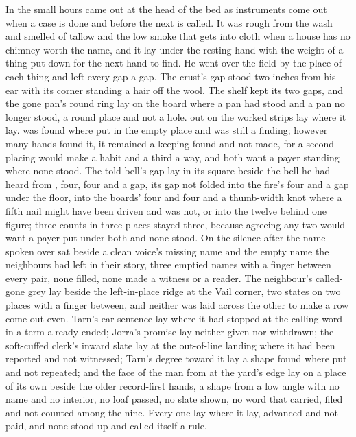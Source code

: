 In the small hours  came out at the head of the bed as instruments come out when a case is done and before the next is called. It was rough from the wash and smelled of tallow and the low smoke that gets into cloth when a house has no chimney worth the name, and it lay under the resting hand with the weight of a thing put down for the next hand to find. He went over the field by the place of each thing and left every gap a gap. The crust's gap stood two inches from his ear with its corner standing a hair off the wool. The shelf kept its two gaps, and the gone pan's round ring lay on the board where a pan had stood and a pan no longer stood, a round place and not a hole.  out on the worked strips lay where it lay.  was found where put in the empty place and was still a finding; however many hands found it, it remained a keeping found and not made, for a second placing would make a habit and a third a way, and both want a payer standing where none stood. The told bell's gap lay in its square beside the bell he had heard from , four, four and a gap, its gap not folded into the fire's four and a gap under the floor, into the boards' four and four and a thumb-width knot where a fifth nail might have been driven and was not, or into the twelve behind one figure; three counts in three places stayed three, because agreeing any two would want a payer put under both and none stood. On  the silence after the name spoken over  sat beside a clean voice's missing name and the empty name the neighbours had left in their story, three emptied names with a finger between every pair, none filled, none made a witness or a reader. The neighbour's called-gone grey lay beside the left-in-place ridge at the Vail corner, two states on two places with a finger between, and neither was laid across the other to make a row come out even. Tarn's ear-sentence lay where it had stopped at the calling word in a term already ended; Jorra's promise lay neither given nor withdrawn; the soft-cuffed clerk's inward slate lay at the out-of-line landing where it had been reported and not witnessed; Tarn's degree toward it lay a shape found where put and not repeated; and the face of the man from  at the yard's edge lay on a place of its own beside the older record-first hands, a shape from a low angle with no name and no interior, no loaf passed, no slate shown, no word that carried, filed and not counted among the nine. Every one lay where it lay, advanced and not paid, and none stood up and called itself a rule.

